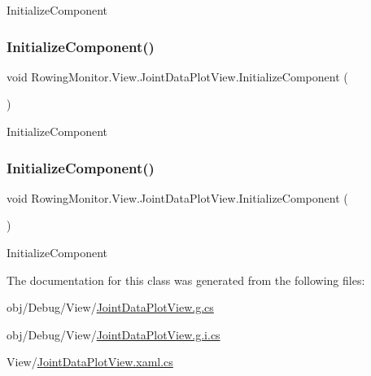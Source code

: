 Initialize\+Component 

\mbox{\label{class_rowing_monitor_1_1_view_1_1_joint_data_plot_view_af935c9c9673d5672bb0359db871acc5d}} 
\subsubsection{\texorpdfstring{Initialize\+Component()}{InitializeComponent()}\hspace{0.1cm}{\footnotesize\ttfamily [3/4]}}
{\footnotesize\ttfamily void Rowing\+Monitor.\+View.\+Joint\+Data\+Plot\+View.\+Initialize\+Component (\begin{DoxyParamCaption}{ }\end{DoxyParamCaption})}



Initialize\+Component 

\mbox{\label{class_rowing_monitor_1_1_view_1_1_joint_data_plot_view_af935c9c9673d5672bb0359db871acc5d}} 
\subsubsection{\texorpdfstring{Initialize\+Component()}{InitializeComponent()}\hspace{0.1cm}{\footnotesize\ttfamily [4/4]}}
{\footnotesize\ttfamily void Rowing\+Monitor.\+View.\+Joint\+Data\+Plot\+View.\+Initialize\+Component (\begin{DoxyParamCaption}{ }\end{DoxyParamCaption})}



Initialize\+Component 



The documentation for this class was generated from the following files\+:\begin{DoxyCompactItemize}
\item 
obj/\+Debug/\+View/\hyperlink{_debug_2_view_2_joint_data_plot_view_8g_8cs}{Joint\+Data\+Plot\+View.\+g.\+cs}\item 
obj/\+Debug/\+View/\hyperlink{_debug_2_view_2_joint_data_plot_view_8g_8i_8cs}{Joint\+Data\+Plot\+View.\+g.\+i.\+cs}\item 
View/\hyperlink{_joint_data_plot_view_8xaml_8cs}{Joint\+Data\+Plot\+View.\+xaml.\+cs}\end{DoxyCompactItemize}
